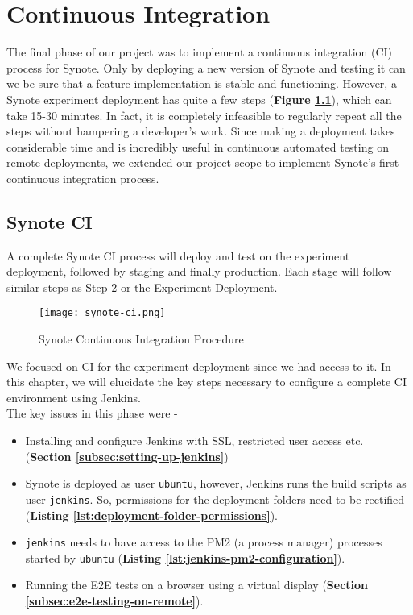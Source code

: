 \chapter{Continuous Integration}
\label{chap:continuous-integration}

The final phase of our project was to implement a continuous integration (CI) process for Synote. Only by deploying a new version of Synote and testing it can we be sure that a feature implementation is stable and functioning. However, a Synote experiment deployment has quite a few steps (\textbf{Figure \ref{fig:synote-ci-proc}}), which can take 15-30 minutes. In fact, it is completely infeasible to regularly repeat all the steps without hampering a developer's work. Since making a deployment takes  considerable time and is incredibly useful in continuous automated testing on remote deployments, we extended our project scope to implement Synote's first continuous integration process.

\section{Synote CI}
\label{sec:synote-ci}

A complete Synote CI process will deploy and test on the experiment deployment, followed by staging and finally production. Each stage will follow similar steps as Step 2 or the Experiment Deployment.

\begin{figure}[!hbt]
  	\centering
 	\texttt{[image: synote-ci.png]}
  	\caption{Synote Continuous Integration Procedure}
 	\label{fig:synote-ci-proc}
\end{figure}

We focused on CI for the experiment deployment since we had access to it. In this chapter, we will elucidate the key steps necessary to configure a complete CI environment using Jenkins.\\

The key issues in this phase were -

\begin{itemize}

  \item Installing and configure Jenkins with SSL, restricted user access etc. (\textbf{Section \ref{subsec:setting-up-jenkins}})

  \item Synote is deployed as user \texttt{ubuntu}, however, Jenkins runs the build scripts as user \texttt{jenkins}. So, permissions for the deployment folders need to be rectified (\textbf{Listing \ref{lst:deployment-folder-permissions}}).

  \item \texttt{jenkins} needs to have access to the PM2 (a process manager) processes started by \texttt{ubuntu} (\textbf{Listing \ref{lst:jenkins-pm2-configuration}}).

  \item Running the E2E tests on a browser using a virtual display (\textbf{Section \ref{subsec:e2e-testing-on-remote}}).

\end{itemize}

